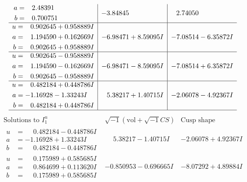 \documentclass[1p]{elsarticle_modified}
\theoremstyle{definition}
\newcommand{\I}{\sqrt{-1}}
\begin{document}
$$\begin{array}{c|c|c}
\begin{aligned}
a &= \phantom{-}2.48391\phantom{ +0.000000I} \\
b &= \phantom{-}0.700751\phantom{ +0.000000I}\end{aligned}
 & -3.84845\phantom{ +0.000000I} & \phantom{-}2.74050\phantom{ +0.000000I} \\ \hline\begin{aligned}
u &= \phantom{-}0.902645 + 0.958889 I \\
a &= \phantom{-}1.194590 + 0.162669 I \\
b &= \phantom{-}0.902645 + 0.958889 I\end{aligned}
 & -6.98471 + 8.59095 I & -7.08514 - 6.35872 I \\ \hline\begin{aligned}
u &= \phantom{-}0.902645 - 0.958889 I \\
a &= \phantom{-}1.194590 - 0.162669 I \\
b &= \phantom{-}0.902645 - 0.958889 I\end{aligned}
 & -6.98471 - 8.59095 I & -7.08514 + 6.35872 I \\ \hline\begin{aligned}
u &= \phantom{-}0.482184 + 0.448786 I \\
a &= -1.16928 - 1.33243 I \\
b &= \phantom{-}0.482184 + 0.448786 I\end{aligned}
 & \phantom{-}5.38217 + 1.40715 I & -2.06078 - 4.92367 I\\
 \hline 
 \end{array}$$\newpage$$\begin{array}{c|c|c}  
\text{Solutions to }I^u_{1}& \I (\text{vol} + \sqrt{-1}CS) & \text{Cusp shape}\\
 \hline 
\begin{aligned}
u &= \phantom{-}0.482184 - 0.448786 I \\
a &= -1.16928 + 1.33243 I \\
b &= \phantom{-}0.482184 - 0.448786 I\end{aligned}
 & \phantom{-}5.38217 - 1.40715 I & -2.06078 + 4.92367 I \\ \hline\begin{aligned}
u &= \phantom{-}0.175989 + 0.585685 I \\
a &= \phantom{-}0.864699 + 0.113620 I \\
b &= \phantom{-}0.175989 + 0.585685 I\end{aligned}
 & -0.850953 - 0.696665 I & -8.07292 + 4.89884 I \\ \hline\begin{aligned}

\end{aligned}
\end{array}$$
\end{document}
